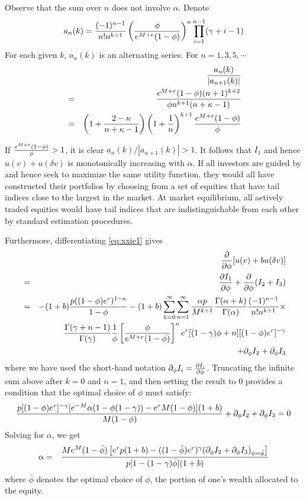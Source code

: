 \documentclass{article}
\begin{document}
Observe that the sum over $n$ does not involve $\alpha$. Denote
\[
a_n(k) =
{(-1)^{n-1} \over n! n^{k+1}}
\left(
     {\phi \over e^{M + r} (1 - \phi)}
     \right)^n
     \prod_{i=1}^{n-1} (\gamma + i - 1)
\]
For each given $k$, $a_n(k)$ is an alternating series.
For $n = 1,3,5,\cdots$
\begin{eqnarray*}
  && {a_n(k) \over |a_{n+1}(k)|} \\
  &=& {
    e^{M + r} (1 - \phi) (n+1)^{k+2}
    \over
    \phi n^{k+1} (n + \kappa - 1)
  } \\
  &=&
  \left(1 + {2 - \kappa \over n + \kappa - 1}\right)
  \left( 1 + {1 \over n} \right)^{k+1}
  {e^{M + r} (1 - \phi) \over \phi}
\end{eqnarray*}

If ${e^{M + r} (1 - \phi) \over \phi} > 1$, it is clear
$a_n(k)/|a_{n+1}(k)| > 1$. It follows that $I_1$ and hence $u(v) +
u(\delta v)$ is monotonically increasing with $\alpha$. If all
investors are guided by and hence seek to maximize the same utility
function, they would all 
have constructed their portfolios by choosing from a set of equities
that have tail indices close to the largest in the market. At market
equilibrium, all actively traded equities would have tail indices that
are indistinguishable from each other by standard estimation procedures.

Furthermore, differentiating \eqref{eq:xxie1} gives
\begin{eqnarray*}
  && \frac{\partial}{\partial \phi} [u(v) + b u(\delta v)] \\
  &=&
  \frac{\partial I_1}{\partial \phi} + \frac{\partial}{\partial \phi}(I_2 + I_3) \\
  &=&
  -(1 + b) {
    p ((1 - \phi) e^r)^{1- \kappa}
    \over
    1 - \phi
  }
  - (1 + b) \sum_{k=0}^\infty \sum_{n=1}^\infty
  {\alpha p \over M^{k + 1}}
  {\Gamma(\alpha + k) \over \Gamma(\alpha)}
  {(-1)^{n-1} \over n! n^{k+1}} \times \\
  &&
  {\Gamma(\gamma + n - 1) \over \Gamma(\gamma)}
  {1 \over \phi}
  \left[
    {\phi \over e^{M+r} (1 - \phi)}
  \right]^n
  e^r [(1 - \gamma) \phi + n] [(1 - \phi) e^r]^{-\gamma} \\
  && + \partial_\phi I_2 + \partial_\phi I_3
\end{eqnarray*}
where we have used the short-hand notation $\partial_\phi I_i =
\frac{\partial I_i}{\partial \phi}$. Truncating the infinite sum above after $k=0$ and
$n=1$, and then setting the result to 0 provides a condition that the
optimal choice of $\phi$ must satisfy:
\begin{eqnarray*}
  {
    p [(1 - \phi) e^r]^{-\gamma}
    [e^{-M} \alpha (1 - \phi (1 - \gamma)) - e^r M (1 - \phi)]
    (1 + b)
    \over
    M (1 - \phi)
  } + \partial_\phi I_2 + \partial_\phi I_3 = 0
\end{eqnarray*}
Solving for $\alpha$, we get
\begin{eqnarray*}
  \alpha &=& {
    M e^M (1 - \bar \phi)
    \left[
      e^r p (1 + b) - ((1 - \bar \phi) e^r)^\gamma
      (\partial_\phi I_2 + \partial_\phi I_3)_{\phi = \bar \phi}
    \right]
    \over
    p [1 - (1 - \gamma) \bar \phi] (1 + b)
  }
\end{eqnarray*}
where $\bar \phi$ denotes the optimal choice of $\phi$, the portion of
one's wealth allocated to the equity.
\end{document}
